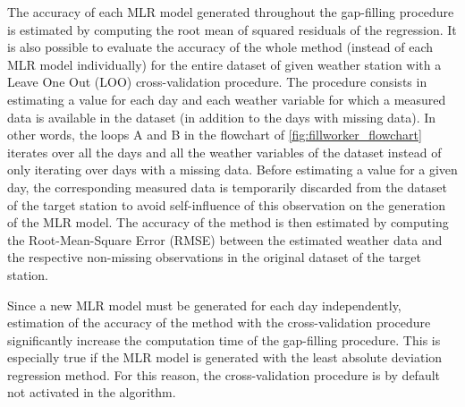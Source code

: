 \documentclass[TechnicalNoteMeteo.tex]{subfiles}
\begin{document}
The accuracy of each MLR model generated throughout the gap-filling procedure is estimated by computing the root mean of squared residuals of the regression. It is also possible to evaluate the accuracy of the whole method (instead of each MLR model individually) for the entire dataset of given weather station with a Leave One Out (LOO) cross-validation procedure. The procedure consists in estimating a value for each day and each weather variable for which a measured data is available in the dataset (in addition to the days with missing data). In other words, the loops A and B in the flowchart of \cref{fig:fillworker_flowchart} iterates over all the days and all the weather variables of the dataset instead of only iterating over days with a missing data. Before estimating a value for a given day, the corresponding measured data is temporarily discarded from the dataset of the target station to avoid self-influence of this observation on the generation of the MLR model. The accuracy of the method is then estimated by computing the Root-Mean-Square Error (RMSE) between the estimated weather data and the respective non-missing observations in the original dataset of the target station.

Since a new MLR model must be generated for each day independently, estimation of the accuracy of the method with the cross-validation procedure significantly increase the computation time of the gap-filling procedure. This is especially true if the MLR model is generated with the least absolute deviation regression method. For this reason, the cross-validation procedure is by default not activated in the algorithm.
\end{document}
